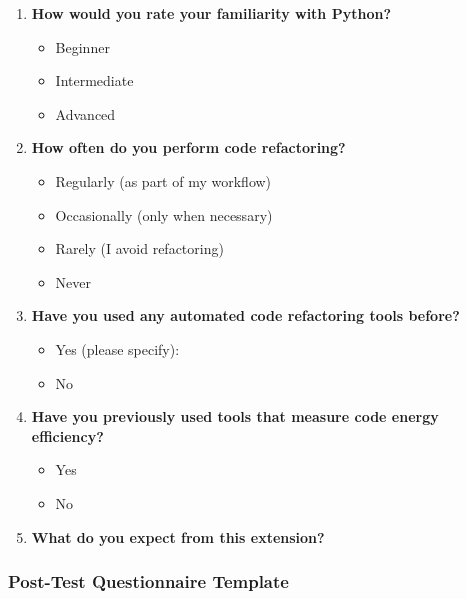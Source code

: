 \documentclass{article}
\begin{document}
\begin{enumerate}
    \item \textbf{How would you rate your familiarity with Python?}
    \begin{itemize}[label=$\square$]
        \item Beginner
        \item Intermediate
        \item Advanced
    \end{itemize}

    \item \textbf{How often do you perform code refactoring?}
    \begin{itemize}[label=$\square$]
        \item Regularly (as part of my workflow)
        \item Occasionally (only when necessary)
        \item Rarely (I avoid refactoring)
        \item Never
    \end{itemize}

    \item \textbf{Have you used any automated code refactoring tools before?}
    \begin{itemize}[label=$\square$]
        \item Yes (please specify): \underline{\hspace{5cm}}
        \item No
    \end{itemize}

    \item \textbf{Have you previously used tools that measure code energy efficiency?}
    \begin{itemize}[label=$\square$]
        \item Yes
        \item No
    \end{itemize}

    \item \textbf{What do you expect from this extension?} \\
    \underline{\hspace{15cm}}
\end{enumerate}

\subsubsection{Post-Test Questionnaire Template}
\end{document}
